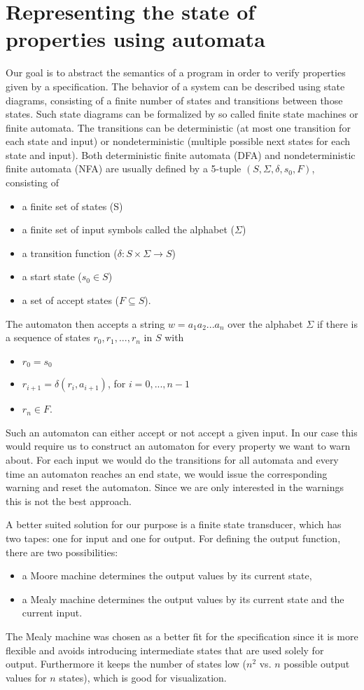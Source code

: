 \section{Representing the state of properties using automata}
Our goal is to abstract the semantics of a program in order to verify properties given by a specification.
The behavior of a system can be described using state diagrams, consisting of a finite number of states and transitions between those states.
Such state diagrams can be formalized by so called finite state machines or finite automata.
The transitions can be deterministic (at most one transition for each state and input) or nondeterministic (multiple possible next states for each state and input).
Both deterministic finite automata (DFA) and nondeterministic finite automata (NFA) are usually defined by a 5-tuple $(S, \Sigma, \delta, s_0, F)$, consisting of
\begin{itemize}
\item a finite set of states (S)
\item a finite set of input symbols called the alphabet ($\Sigma$)
\item a transition function ($\delta : S \times \Sigma \rightarrow S$)
\item a start state ($s_0 \in S$)
\item a set of accept states ($F \subseteq S$).
\end{itemize}
The automaton then accepts a string $w = a_1 a_2 ... a_n$ over the alphabet $\Sigma$ if there is a sequence of states $r_0, r_1, ..., r_n$ in $S$ with
\begin{itemize}
\item $r_0 = s_0$
\item $r_{i+1} = \delta(r_i, a_{i+1})$, for $i=0, ..., n-1$
\item $r_n \in F$.
\end{itemize}
Such an automaton can either accept or not accept a given input. In our case this would require us to construct an automaton for every property we want to warn about. For each input we would do the transitions for all automata and every time an automaton reaches an end state, we would issue the corresponding warning and reset the automaton. Since we are only interested in the warnings this is not the best approach.

A better suited solution for our purpose is a finite state transducer, which has two tapes: one for input and one for output. For defining the output function, there are two possibilities:
\begin{itemize}
\item a Moore machine determines the output values by its current state,
\item a Mealy machine determines the output values by its current state and the current input.
\end{itemize}
The Mealy machine was chosen as a better fit for the specification since it is more flexible and avoids introducing intermediate states that are used solely for output. Furthermore it keeps the number of states low ($n^2$ vs. $n$ possible output values for $n$ states), which is good for visualization.

